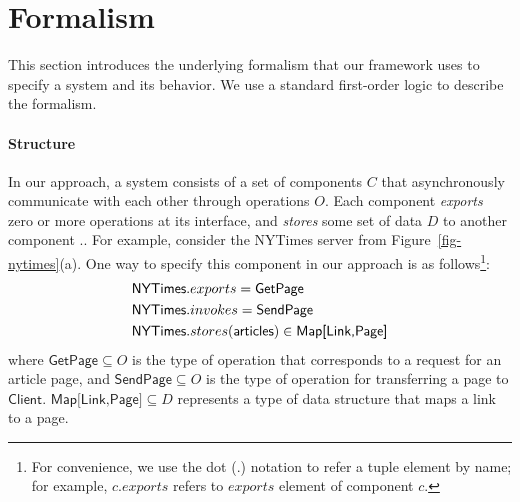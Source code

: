 
\section{Formalism}
\label{sec-formalism}

This section introduces the underlying formalism that our framework
uses to specify a system and its behavior. We use a standard
first-order logic to describe the formalism.

\paragraph{\textbf{Structure}} In our approach, a system consists of a
set of components $C$ that asynchronously communicate with each other
through operations $O$.  Each component \textit{exports} zero or more
operations at its interface, and \textit{stores} some set of data
$D$ to another
component ..  For
example, consider the \textsf{NYTimes} server from
Figure~\ref{fig-nytimes}(a). One way to specify this component in our
approach is as follows\footnote{For convenience, we use the dot (.)
  notation to refer a tuple element by name; for example, $c.exports$
  refers to $exports$ element of component $c$.}:
\begin{align*}
&\textsf{NYTimes}.exports = \textsf{GetPage}\\
&\textsf{NYTimes}.invokes = \textsf{SendPage}\\
&\textsf{NYTimes}.stores(\textsf{articles}) \in
\textsf{Map[Link,Page]} \am{\mbox{why $\in$ and not $=$? \textsf{Map} is also undefined, as well as the \textsf{Map[K,V]} syntax}}
\end{align*}
where $\textsf{GetPage} \subseteq O$ is the type of operation that
corresponds to a request for an article page, and $\textsf{SendPage}
\subseteq O$ is the type of operation for transferring a page to
$\textsf{Client}$. $\textsf{Map[Link,Page]} \subseteq D$ represents a
type of data structure that maps a link to a page. 

